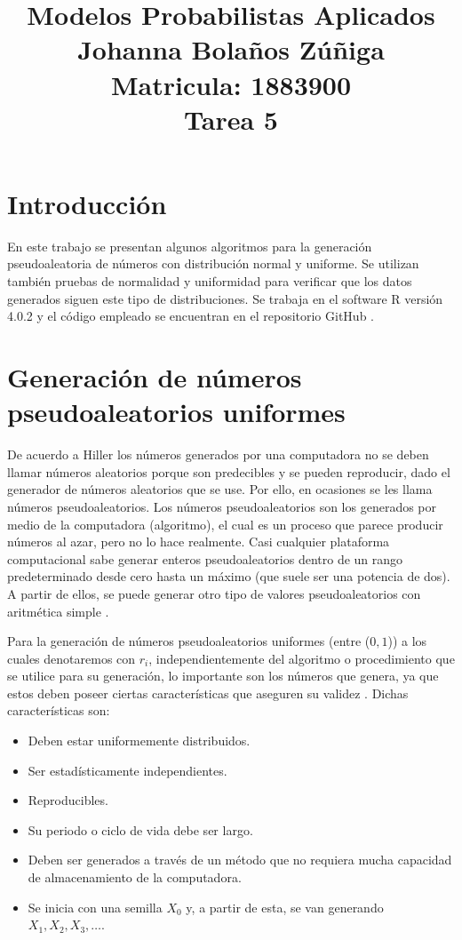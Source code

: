 \documentclass{article}
\title{
\centering
Modelos Probabilistas Aplicados \\
Johanna Bolaños Zúñiga \\
Matricula: 1883900\\
Tarea 5
}
\date{}
\begin{document}
\maketitle

\section{Introducción}
En este trabajo se presentan algunos algoritmos para la generación pseudoaleatoria de números con distribución normal y uniforme. Se utilizan también pruebas de normalidad y uniformidad para verificar que los datos generados siguen este tipo de distribuciones. Se trabaja en el software R versión 4.0.2 \cite{r} y el código empleado se encuentran en el repositorio GitHub \cite{github}.

\section{Generación de números pseudoaleatorios uniformes} \label{distuniforme}
De acuerdo a Hiller \cite{hiller} los números generados por una computadora no se deben llamar números aleatorios porque son predecibles y se pueden reproducir, dado el generador de números aleatorios que se use. Por ello, en ocasiones se les llama números pseudoaleatorios. Los números pseudoaleatorios son los generados por medio de la computadora (algoritmo), el cual es un proceso que parece producir números al azar, pero no lo hace realmente. Casi cualquier plataforma computacional sabe generar enteros pseudoaleatorios dentro de un rango predeterminado desde cero hasta un máximo (que suele ser una potencia de dos). A partir de ellos, se puede generar otro tipo de valores pseudoaleatorios con aritmética simple \cite{notasElisa}. 

Para la generación de números pseudoaleatorios uniformes (entre ($0, 1$)) a los cuales denotaremos con $r_{i}$, independientemente del algoritmo o procedimiento que se utilice para su generación, lo importante son los números que genera, ya que estos deben poseer ciertas características que aseguren su validez \cite{coss}. Dichas características son:

\begin{itemize}
    \item Deben estar uniformemente distribuidos.
    \item Ser estadísticamente independientes.
    \item Reproducibles.
    \item Su periodo o ciclo de vida debe ser largo.
    \item Deben ser generados a través de un método que no requiera mucha capacidad de almacenamiento de la computadora.
    \item Se inicia con una semilla $X_{0}$ y, a partir de esta, se van generando $X_{1}, X_{2}, X_{3}, \dots$.
\end{itemize}
\end{document}
